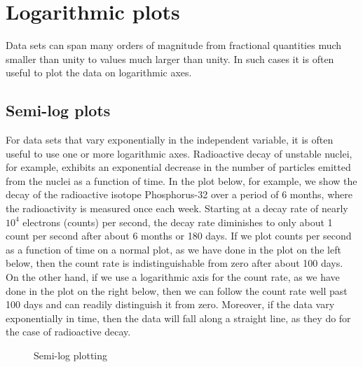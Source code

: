 \documentclass[letterpaper,10pt,english]{sphinxmanual}
\begin{document}
\section{Logarithmic plots}
\label{chap5/chap5_plot:logarithmic-plots}
Data sets can span many orders of magnitude from fractional quantities much smaller than unity to values much larger than unity.  In such cases it is often useful to plot the data on logarithmic axes.


\subsection{Semi-log plots}
\label{chap5/chap5_plot:semi-log-plots}
For data sets that vary exponentially in the independent variable, it is often useful to use one or more logarithmic axes.  Radioactive decay of unstable nuclei, for example, exhibits an exponential decrease in the number of particles emitted from the nuclei as a function of time.  In the plot below, for example, we show the decay of the radioactive isotope Phosphorus-32 over a period of 6 months, where the radioactivity is measured once each week.  Starting at a decay rate of nearly \(10^4\) electrons (counts) per second, the decay rate diminishes to only about 1 count per second after about 6 months or 180 days.  If we plot counts per second as a function of time on a normal plot, as we have done in the plot on the left below, then the count rate is indistinguishable from zero after about 100 days.  On the other hand, if we use a logarithmic axis for the count rate, as we have done in the plot on the right below, then we can follow the count rate well past 100 days and can readily distinguish it from zero.  Moreover, if the data vary exponentially in time, then the data will fall along a straight line, as they do for the case of radioactive decay.
\begin{figure}[htbp]
\centering
\capstart

\caption{Semi-log plotting}\label{chap5/chap5_plot:fig-semilogdemo}\end{figure}
\end{document}
